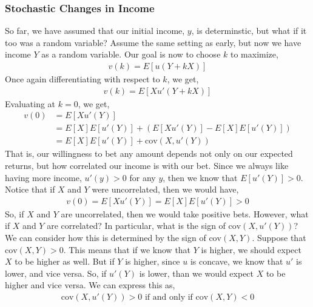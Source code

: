 \subsubsection*{Stochastic Changes in Income}
So far, we have assumed that our initial income, $y$, is determinstic, but what if it too was a random variable? Assume the same setting as early, but now we have income $Y$ as a random variable. Our goal is now to choose $k$ to maximize,
\begin{align*}
    v(k) = E[u(Y + kX)]
\end{align*}
Once again differentiating with respect to $k$, we get,
\begin{align*}
    v(k) = E[X u'(Y + kX)]
\end{align*}
Evaluating at $k = 0$, we get,
\begin{align*}
    v(0) &= E[X u'(Y)] \\
    &= E[X]E[u'(Y)] + (E[X u'(Y)] - E[X]E[u'(Y)]) \\
    &= E[X]E[u'(Y)] + \text{cov}(X, u'(Y))
\end{align*}
That is, our willingness to bet any amount depends not only on our expected returns, but how correlated our income is with our bet. Since we always like having more income, $u'(y) > 0$ for any $y$, then we know that $E[u'(Y)] > 0$. Notice that if $X$ and $Y$ were uncorrelated, then we would have,
\begin{align*}
    v(0) = E[X u'(Y)] = E[X] E[u'(Y)] > 0
\end{align*}
So, if $X$ and $Y$ are uncorrelated, then we would take positive bets. However, what if $X$ and $Y$ are correlated? In particular, what is the sign of $\text{cov}(X, u'(Y))$? We can consider how this is determined by the sign of $\text{cov}(X, Y)$. Suppose that $\text{cov}(X, Y) > 0$. This means that if we know that $Y$ is higher, we should expect $X$ to be higher as well. But if $Y$ is higher, since $u$ is concave, we know that $u'$ is lower, and vice versa. So, if $u'(Y)$ is lower, than we would expect $X$ to be higher and vice versa. We can express this as,
\begin{align*}
    \text{cov}(X, u'(Y)) > 0 \text{ if and only if } \text{cov}(X, Y) < 0
\end{align*}
